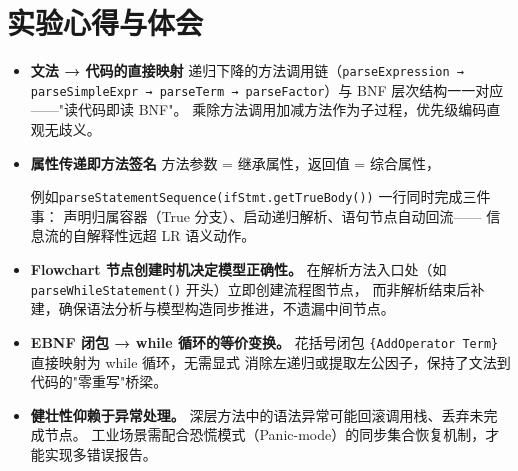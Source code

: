 \documentclass[a4paper]{article}
\begin{document}
\section{实验心得与体会}

\begin{itemize}

\item \textbf{文法 → 代码的直接映射}
递归下降的方法调用链（\texttt{parseExpression → parseSimpleExpr → parseTerm
→ parseFactor}）与 BNF 层次结构一一对应——"读代码即读 BNF"。
乘除方法调用加减方法作为子过程，优先级编码直观无歧义。

\item \textbf{属性传递即方法签名}
方法参数 = 继承属性，返回值 = 综合属性，

例如\texttt{parseStatementSequence(ifStmt.getTrueBody())} 一行同时完成三件事：
声明归属容器（True 分支）、启动递归解析、语句节点自动回流——
信息流的自解释性远超 LR 语义动作。

\item \textbf{Flowchart 节点创建时机决定模型正确性。}
在解析方法入口处（如 \texttt{parseWhileStatement()} 开头）立即创建流程图节点，
而非解析结束后补建，确保语法分析与模型构造同步推进，不遗漏中间节点。

\item \textbf{EBNF 闭包 → while 循环的等价变换。}
花括号闭包 \texttt{\{AddOperator Term\}} 直接映射为 while 循环，无需显式
消除左递归或提取左公因子，保持了文法到代码的"零重写"桥梁。

\item \textbf{健壮性仰赖于异常处理。}
深层方法中的语法异常可能回滚调用栈、丢弃未完成节点。
工业场景需配合恐慌模式（Panic-mode）的同步集合恢复机制，才能实现多错误报告。

\end{itemize}
\end{document}
